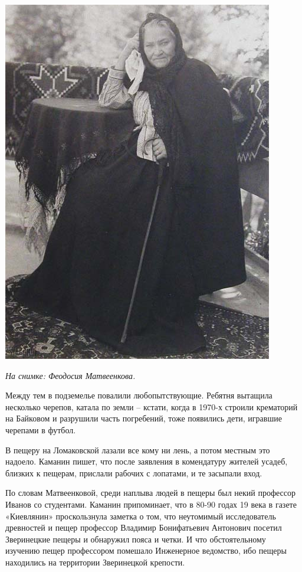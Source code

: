 \begin{center}
\includegraphics[width=0.98\linewidth]{chast-colebanie-osnov/nachalo/matvienko.jpg}

\textit{На снимке: Феодосия Матвеенкова.}
\end{center}

Между тем в подземелье повалили любопытствующие. Ребятня вытащила несколько черепов, катала по земли – кстати, когда в 1970-х строили крематорий на Байковом и разрушили часть погребений, тоже появились дети, игравшие черепами в футбол.

В пещеру на Ломаковской лазали все кому ни лень, а потом местным это надоело. Каманин пишет, что после заявления в комендатуру жителей усадеб, близких к пещерам, прислали рабочих с лопатами, и те засыпали вход.

По словам Матвеенковой, среди наплыва людей в пещеры был некий профессор Иванов со студентами. Каманин припоминает, что в 80-90 годах 19 века в газете «Киевлянин» проскользнула заметка о том, что неутомимый исследователь древностей и пещер профессор Владимир Бонифатьевич Антонович посетил Зверинецкие пещеры и обнаружил пояса и четки. И что обстоятельному изучению пещер профессором помешало Инженерное ведомство, ибо пещеры находились на территории Зверинецкой крепости. 

